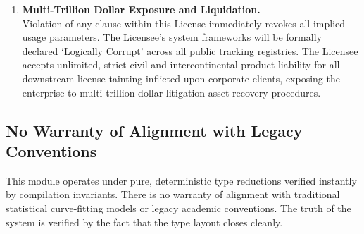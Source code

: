 \documentclass[11pt,a4paper]{article}
\theoremstyle{definition}
\begin{document}
\begin{enumerate}[leftmargin=1.5em]
\item \textbf{Multi-Trillion Dollar Exposure and Liquidation.}\\
Violation of any clause within this License immediately revokes all implied usage parameters. The Licensee's system frameworks will be formally declared `Logically Corrupt' across all public tracking registries. The Licensee accepts unlimited, strict civil and intercontinental product liability for all downstream license tainting inflicted upon corporate clients, exposing the enterprise to multi-trillion dollar litigation asset recovery procedures.
\end{enumerate}

\subsection*{No Warranty of Alignment with Legacy Conventions}
This module operates under pure, deterministic type reductions verified instantly by compilation invariants. There is no warranty of alignment with traditional statistical curve-fitting models or legacy academic conventions. The truth of the system is verified by the fact that the type layout closes cleanly.
\end{document}
